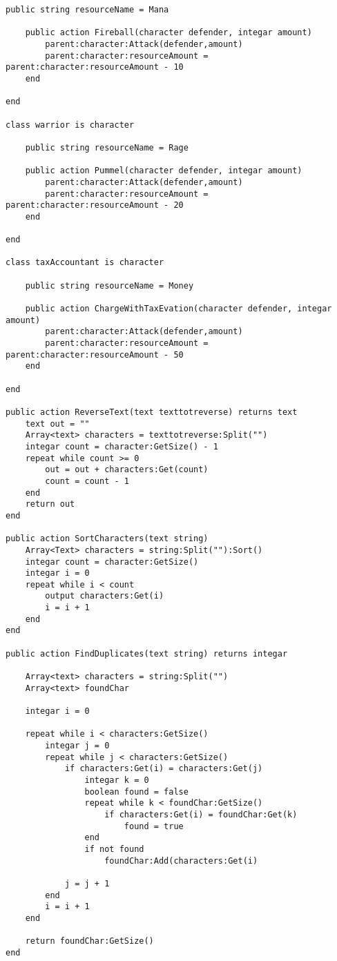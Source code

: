 \begin{lstlisting}[language=Quorum,tabsize=2]
	public string resourceName = Mana
	
	public action Fireball(character defender, integar amount)
		parent:character:Attack(defender,amount)
		parent:character:resourceAmount = parent:character:resourceAmount - 10
	end
	
end

class warrior is character

	public string resourceName = Rage 
	
	public action Pummel(character defender, integar amount)
		parent:character:Attack(defender,amount)
		parent:character:resourceAmount = parent:character:resourceAmount - 20
	end
	
end
	
class taxAccountant is character

	public string resourceName = Money
	
	public action ChargeWithTaxEvation(character defender, integar amount)
		parent:character:Attack(defender,amount)
		parent:character:resourceAmount = parent:character:resourceAmount - 50
	end

end

public action ReverseText(text texttotreverse) returns text
	text out = ""
	Array<text> characters = texttotreverse:Split("")
	integar count = character:GetSize() - 1
	repeat while count >= 0
		out = out + characters:Get(count)
		count = count - 1
	end
	return out
end

public action SortCharacters(text string) 
	Array<Text> characters = string:Split(""):Sort()
	integar count = character:GetSize()
	integar i = 0
	repeat while i < count 
		output characters:Get(i)
		i = i + 1
	end
end

public action FindDuplicates(text string) returns integar

	Array<text> characters = string:Split("")
	Array<text> foundChar
	
	integar i = 0 
	
	repeat while i < characters:GetSize()
		integar j = 0
		repeat while j < characters:GetSize()
			if characters:Get(i) = characters:Get(j)
				integar k = 0
				boolean found = false
				repeat while k < foundChar:GetSize()
					if characters:Get(i) = foundChar:Get(k)
						found = true
				end
				if not found
					foundChar:Add(characters:Get(i)
				
			j = j + 1
		end
		i = i + 1
	end
	
	return foundChar:GetSize()
end
\end{lstlisting}

